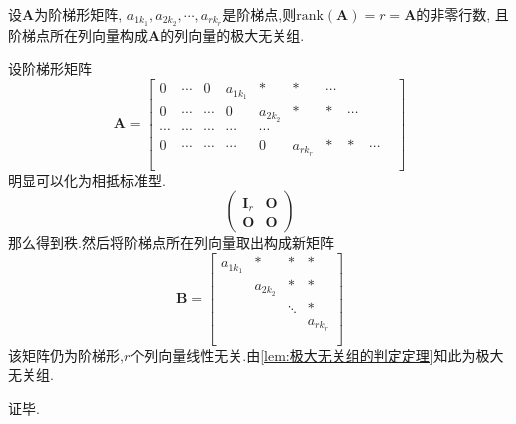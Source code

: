 \begin{green}
\begin{lemma}[阶梯形与秩]\label{lem:阶梯形与秩}
    设$\bm{A}$为阶梯形矩阵,
    $a_{1k_1},a_{2k_2},\cdots,
    a_{rk_r}$是阶梯点,则$\mathrm{rank}\left(\bm{A}
    \right)=r=\bm{A}$的非零行数,
    且阶梯点所在列向量构成$\bm{A}$的列向量的极大无关组.
\end{lemma}
\begin{Proof}设阶梯形矩阵
\[
\bm{A}=
\begin{bmatrix}
    0&\cdots&0&a_{1k_1}&*&*&\cdots&&&\\
    0&\cdots&\cdots&0&a_{2k_2}&*&*&\cdots&&\\
    \cdots&\cdots&\cdots&\cdots&\cdots&&&&&\\
    0&\cdots&\cdots&\cdots&0&a_{rk_r}&*&*&\cdots&\\
    &&&&&&&&&\\
\end{bmatrix}
\]
明显可以化为相抵标准型.\[
\begin{pmatrix}
        \bm{I}_r & \bm{O} \\
        \bm{O} & \bm{O}
    \end{pmatrix}
\]
那么得到秩.然后将阶梯点所在列向量取出构成新矩阵
\[
\bm{B}=
\begin{bmatrix}
    a_{1k_1}&*&*&*\\
    &a_{2k_2}&*&*\\
    &&\ddots&*\\
    &&&a_{rk_r}\\
    &&&\\
\end{bmatrix}
\]
该矩阵仍为阶梯形,$r$个列向量线性无关.由\cref{lem:极大无关组的判定定理}知此为极大无关组.

证毕. 
\end{Proof}
\end{green}
